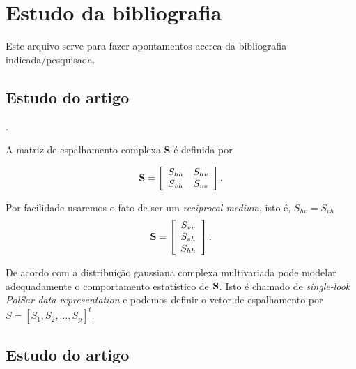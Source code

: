 \documentclass[10pt,a4paper]{article}
\begin{document}
\nocite{lee94}

\section{Estudo da bibliografia}

Este arquivo serve para fazer apontamentos acerca da bibliografia indicada/pesquisada.

\subsection{Estudo do artigo  \cite{lee94}}.

A matriz de espalhamento complexa {\bf S} é definida por

$$
{\bf S} = \left[
\begin{array}{cc}
	S_{hh}   & S_{hv}   \\
	S_{vh}   & S_{vv}   \\
\end{array}
\right].
$$

Por facilidade usaremos o fato de ser um {\it reciprocal medium}, isto é, $S_{hv}=S_{vh}$
$$
{\bf S} = \left[
\begin{array}{c}
	S_{vv}      \\
	S_{vh}     \\
	S_{hh}      \\
\end{array}
\right].
$$

De acordo com \cite{goodman1963} a distribuíção gaussiana complexa multivariada pode modelar adequadamente o comportamento estatístico de $\bf S$. Isto é chamado de {\it single-look PolSar data representation} e podemos definir o vetor de espalhamento por $S=[S_1,S_2,\dots,S_p]^t$. 



\subsection{Estudo do artigo  \cite{goodman1963}}









 
\end{document}
